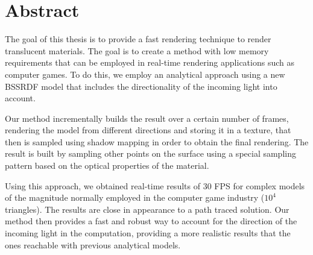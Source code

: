 \chapter{Abstract}

The goal of this thesis is to provide a fast rendering technique to render translucent materials. The goal is to create a method with low memory requirements that can be employed in real-time rendering applications such as computer games. To do this, we employ an analytical approach using a new BSSRDF model that includes the directionality of the incoming light into account. 

Our method incrementally builds the result over a certain number of frames, rendering the model from different directions and storing it in a texture, that then is sampled using shadow mapping in order to obtain the final rendering. The result is built by sampling other points on the surface using a special sampling pattern based on the optical properties of the material.

Using this approach, we obtained real-time results of 30 FPS for complex models of the magnitude normally employed in the computer game industry ($10^4$ triangles). The results are close in appearance to a path traced solution. Our method then provides a fast and robust way to account for the direction of the incoming light in the computation, providing a more realistic results that the ones reachable with previous analytical models. 